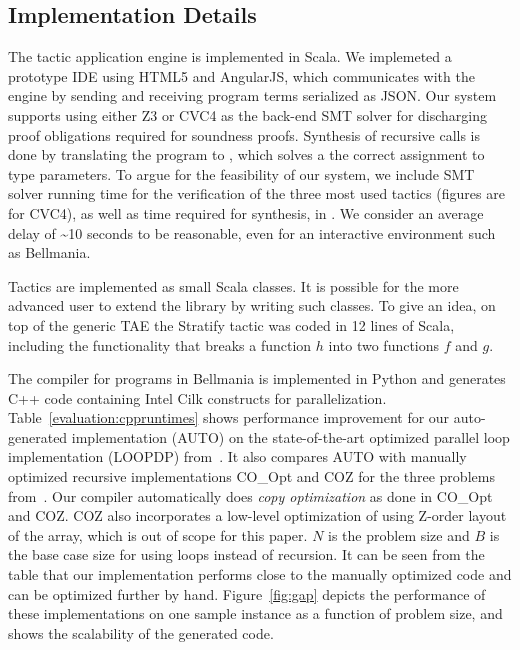 \subsection{Implementation Details}
The tactic application engine is implemented in Scala. We implemeted a prototype
IDE using HTML5 and AngularJS, which communicates with the engine by sending
and receiving program terms serialized as JSON. Our system supports using either
Z3 or CVC4 as the back-end SMT solver for discharging proof obligations required
for soundness proofs. Synthesis of recursive calls is done by translating the
program to \Sketch{}, which solves a the correct assignment to type parameters.
To argue for the feasibility of our system, we include
SMT solver running time for the verification of the three most used tactics (figures are for CVC4),
as well as time required for \Sketch{} synthesis, in .
We consider an average delay of \textasciitilde 10 seconds to be reasonable, even for an interactive
environment such as Bellmania.

Tactics are implemented as small Scala classes. It is possible for
the more advanced user to extend the library by writing such classes.
To give an idea, on top of the generic TAE the {\sf Stratify} tactic was coded in 12 lines of Scala,
including the functionality that breaks a function $h$ into two functions $f$ and $g$.

The compiler for programs in Bellmania is implemented in 
Python and generates C++ code containing Intel Cilk constructs for parallelization.
Table~\ref{evaluation:cppruntimes} shows performance improvement for our 
auto-generated implementation (AUTO) on the state-of-the-art optimized parallel
loop implementation (LOOPDP) from~\cite{IPDPS15/Tithi}. It also compares AUTO with manually 
optimized recursive implementations CO\_Opt and COZ for the three problems from~\cite{IPDPS15/Tithi}. 
Our compiler automatically does \textit{copy optimization} 
as done in CO\_Opt and COZ. COZ also incorporates a low-level 
optimization of using Z-order layout of the array,
which is out of scope for this paper. %
$N$ is the problem size and $B$ is the base case size for using loops 
instead of recursion. It can be seen from the table that our implementation 
performs close to the manually optimized code and can be optimized further by 
hand. Figure~\ref{fig:gap} depicts the performance of these implementations 
on one sample instance
as a function of problem size, and shows the scalability of the generated code. 

